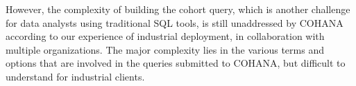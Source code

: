 However, the complexity of building the cohort query, which is another challenge for data analysts using traditional SQL tools, is still unaddressed by COHANA according to our experience of industrial deployment, in collaboration with multiple organizations. The major complexity lies in the various terms and options that are involved in the queries submitted to COHANA, but difficult to understand for industrial clients.







